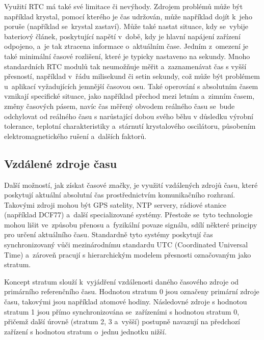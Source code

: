 Využití RTC má také své limitace či nevýhody. Zdrojem problémů může být například krystal, pomocí kterého je čas udržován, může například dojít k~jeho poruše (například se~krystal zastaví). Může také nastat situace, kdy se~vybije bateriový článek, poskytující napětí v~době, kdy je hlavní napájení zařízení odpojeno, a~je tak ztracena informace o~aktuálním čase. Jedním z~omezení je také minimální časové rozlišení, které je typicky nastaveno na sekundy. Mnoho standardních RTC modulů tak neumožňuje měřit a~zaznamenávat čas s vyšší přesností, například v~řádu milisekund či setin sekundy, což může být problémem u~aplikací vyžadujících jemnější časovou osu. Také operování s absolutním časem vznikají specifické situace, jako například přechod mezi letním a~zimním časem, změny časových pásem, navíc čas měřený obvodem reálného času se~bude odchylovat od reálného času s narůstající dobou svého běhu v důsledku  výrobní tolerance, teplotní charakteristiky a~stárnutí krystalového oscilátoru, působením elektromagnetického rušení a~dalších faktorů.~\cite{jameco_choosing_right_real_time_clock_chip_or_module, embed_journal_interfacing_rtc_with_microcontroler, ti_rtc}

\subsection{Vzdálené zdroje času}
Další možností, jak získat časové značky, je využití vzdálených zdrojů času, které poskytují aktuální absolutní čas prostřednictvím komunikačního rozhraní. Takovými zdroji mohou být GPS satelity, NTP servery, rádiové stanice (například DCF77) a~další specializované systémy. Přestože se~tyto technologie mohou lišit ve~způsobu přenosu a~fyzikální povaze signálu, sdílí některé principy pro určení aktuálního času. Standardně tyto systémy poskytují čas synchronizovaný vůči mezinárodnímu standardu UTC (Coordinated Universal Time) a~zároveň pracují s hierarchickým modelem přesnosti označovaným jako stratum.~\cite{sparkfun_gps, sookocheff_ntp}

Koncept stratum slouží k~vyjádření vzdálenosti daného časového zdroje od primárního referenčního času. Hodnotou stratum 0 jsou označeny primární zdroje času, takovými jsou například atomové hodiny. Následovné zdroje s hodnotou stratum 1 jsou přímo synchronizována se~zařízeními s hodnotou stratum 0, přičemž další úrovně (stratum 2, 3 a~vyšší) postupně navazují na předchozí zařízení s hodnotou stratum o~jednu jednotku nižší.~\cite{sookocheff_ntp}

